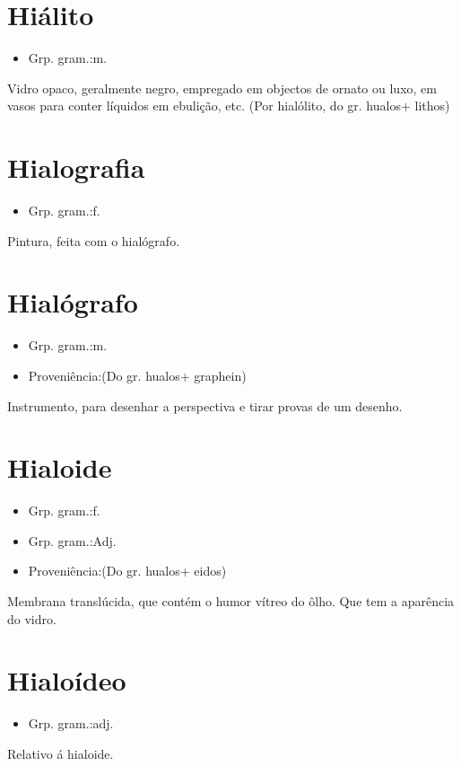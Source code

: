 \documentclass{article}
\begin{document}
\section{Hiálito}
\begin{itemize}
\item {Grp. gram.:m.}
\end{itemize}
Vidro opaco, geralmente negro, empregado em objectos de ornato ou luxo, em vasos para conter líquidos em ebulição, etc.
(Por \textunderscore hialólito\textunderscore , do gr. \textunderscore hualos\textunderscore  + \textunderscore lithos\textunderscore )
\section{Hialografia}
\begin{itemize}
\item {Grp. gram.:f.}
\end{itemize}
Pintura, feita com o hialógrafo.
\section{Hialógrafo}
\begin{itemize}
\item {Grp. gram.:m.}
\end{itemize}
\begin{itemize}
\item {Proveniência:(Do gr. \textunderscore hualos\textunderscore  + \textunderscore graphein\textunderscore )}
\end{itemize}
Instrumento, para desenhar a perspectiva e tirar provas de um desenho.
\section{Hialoide}
\begin{itemize}
\item {Grp. gram.:f.}
\end{itemize}
\begin{itemize}
\item {Grp. gram.:Adj.}
\end{itemize}
\begin{itemize}
\item {Proveniência:(Do gr. \textunderscore hualos\textunderscore  + \textunderscore eidos\textunderscore )}
\end{itemize}
Membrana translúcida, que contém o humor vítreo do ôlho.
Que tem a aparência do vidro.
\section{Hialoídeo}
\begin{itemize}
\item {Grp. gram.:adj.}
\end{itemize}
Relativo á hialoide.
\end{document}
